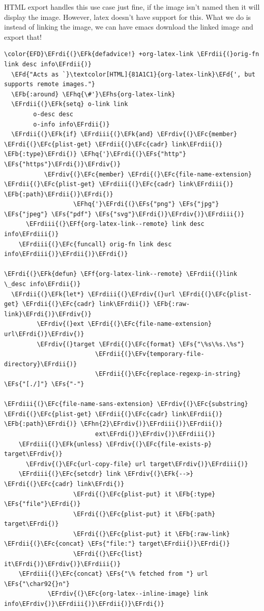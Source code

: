 \documentclass{scrartcl}
\newcommand{\EFk}[1]{\textcolor{EFk}{#1}} %
\newcommand{\EFd}[1]{\textcolor{EFd}{#1}} %
\newcommand{\EFs}[1]{\textcolor{EFs}{#1}} %
\newcommand{\EFb}[1]{\textcolor{EFb}{#1}} %
\newcommand{\EFc}[1]{\textcolor{EFc}{#1}} %
\newcommand{\EFv}[1]{\textcolor{EFv}{#1}} %
\newcommand{\EFf}[1]{\textcolor{EFf}{#1}} %
\newcommand{\EFhn}[1]{#1} %
\newcommand{\EFhq}[1]{#1} %
\newcommand{\EFhs}[1]{#1} %
\newcommand{\EFrdi}[1]{#1} %
\newcommand{\EFrdii}[1]{#1} %
\newcommand{\EFrdiii}[1]{#1} %
\newcommand{\EFrdiv}[1]{#1} %
\begin{document}
HTML export handles this use case just fine, if the image isn't named then it
will display the image. However, latex doesn't have support for this. What we do
is instead of linking the image, we can have emacs download the linked image and
export that!
\begin{Code}
\begin{Verbatim}[]
\color{EFD}\EFrdi{(}\EFk{defadvice!} +org-latex-link \EFrdii{(}orig-fn link desc info\EFrdii{)}
  \EFd{"Acts as `}\textcolor[HTML]{81A1C1}{org-latex-link}\EFd{', but supports remote images."}
  \EFb{:around} \EFhq{\#'}\EFhs{org-latex-link}
  \EFrdii{(}\EFk{setq} o-link link
        o-desc desc
        o-info info\EFrdii{)}
  \EFrdii{(}\EFk{if} \EFrdiii{(}\EFk{and} \EFrdiv{(}\EFc{member} \EFrdi{(}\EFc{plist-get} \EFrdii{(}\EFc{cadr} link\EFrdii{)} \EFb{:type}\EFrdi{)} \EFhq{'}\EFrdi{(}\EFs{"http"} \EFs{"https"}\EFrdi{)}\EFrdiv{)}
           \EFrdiv{(}\EFc{member} \EFrdi{(}\EFc{file-name-extension} \EFrdii{(}\EFc{plist-get} \EFrdiii{(}\EFc{cadr} link\EFrdiii{)} \EFb{:path}\EFrdii{)}\EFrdi{)}
                   \EFhq{'}\EFrdi{(}\EFs{"png"} \EFs{"jpg"} \EFs{"jpeg"} \EFs{"pdf"} \EFs{"svg"}\EFrdi{)}\EFrdiv{)}\EFrdiii{)}
      \EFrdiii{(}\EFf{org-latex-link--remote} link desc info\EFrdiii{)}
    \EFrdiii{(}\EFc{funcall} orig-fn link desc info\EFrdiii{)}\EFrdii{)}\EFrdi{)}

\EFrdi{(}\EFk{defun} \EFf{org-latex-link--remote} \EFrdii{(}link \_desc info\EFrdii{)}
  \EFrdii{(}\EFk{let*} \EFrdiii{(}\EFrdiv{(}url \EFrdi{(}\EFc{plist-get} \EFrdii{(}\EFc{cadr} link\EFrdii{)} \EFb{:raw-link}\EFrdi{)}\EFrdiv{)}
         \EFrdiv{(}ext \EFrdi{(}\EFc{file-name-extension} url\EFrdi{)}\EFrdiv{)}
         \EFrdiv{(}target \EFrdi{(}\EFc{format} \EFs{"\%s\%s.\%s"}
                         \EFrdii{(}\EFv{temporary-file-directory}\EFrdii{)}
                         \EFrdii{(}\EFc{replace-regexp-in-string} \EFs{"[./]"} \EFs{"-"}
                                                   \EFrdiii{(}\EFc{file-name-sans-extension} \EFrdiv{(}\EFc{substring} \EFrdi{(}\EFc{plist-get} \EFrdii{(}\EFc{cadr} link\EFrdii{)} \EFb{:path}\EFrdi{)} \EFhn{2}\EFrdiv{)}\EFrdiii{)}\EFrdii{)}
                         ext\EFrdi{)}\EFrdiv{)}\EFrdiii{)}
    \EFrdiii{(}\EFk{unless} \EFrdiv{(}\EFc{file-exists-p} target\EFrdiv{)}
      \EFrdiv{(}\EFc{url-copy-file} url target\EFrdiv{)}\EFrdiii{)}
    \EFrdiii{(}\EFc{setcdr} link \EFrdiv{(}\EFk{-->} \EFrdi{(}\EFc{cadr} link\EFrdi{)}
                   \EFrdi{(}\EFc{plist-put} it \EFb{:type} \EFs{"file"}\EFrdi{)}
                   \EFrdi{(}\EFc{plist-put} it \EFb{:path} target\EFrdi{)}
                   \EFrdi{(}\EFc{plist-put} it \EFb{:raw-link} \EFrdii{(}\EFc{concat} \EFs{"file:"} target\EFrdii{)}\EFrdi{)}
                   \EFrdi{(}\EFc{list} it\EFrdi{)}\EFrdiv{)}\EFrdiii{)}
    \EFrdiii{(}\EFc{concat} \EFs{"\% fetched from "} url \EFs{"\char92{}n"}
            \EFrdiv{(}\EFc{org-latex--inline-image} link info\EFrdiv{)}\EFrdiii{)}\EFrdii{)}\EFrdi{)}
\end{Verbatim}
\end{Code}
\end{document}
